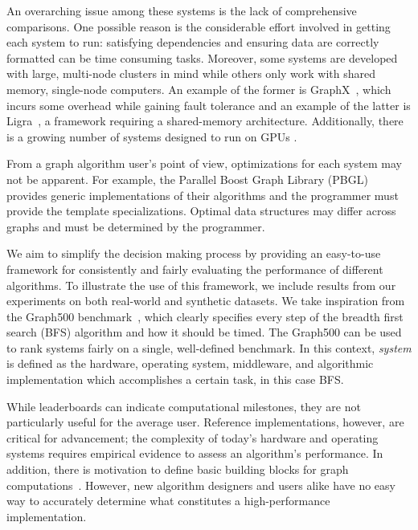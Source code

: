 \documentclass[conference]{IEEEtran}
\begin{document}
An overarching issue among these systems is the lack of comprehensive comparisons. One possible reason is the considerable effort involved in getting each system to run: satisfying dependencies and ensuring data are correctly formatted can be time consuming tasks. Moreover, some systems are developed with large, multi-node clusters in mind while others only work with shared memory, single-node computers. An example of the former is GraphX~\cite{Xin:2013:GraphX}, which incurs some overhead while gaining fault tolerance and an example of the latter is Ligra~\cite{Shun:2013:Ligra}, a framework requiring a shared-memory architecture. Additionally, there is a growing number of systems designed to run on GPUs \cite{Zhong:2014:Medusa}.

From a graph algorithm user's point of view, optimizations for each system may not be apparent. For example, the Parallel Boost Graph Library (PBGL)~\cite{Gregor:2005:PBGL} provides generic implementations of their algorithms and the programmer must provide the template specializations. Optimal data structures may differ across graphs and must be determined by the programmer.

We aim to simplify the decision making process by providing an easy-to-use framework for consistently and fairly evaluating the performance of different algorithms. To illustrate the use of this framework, we include results from our experiments on both real-world and synthetic datasets. We take inspiration from the Graph500 benchmark~\cite{Murphy:2010:Graph500}, which clearly specifies every step of the breadth first search (BFS) algorithm and how it should be timed. The Graph500 can be used to rank systems fairly on a single, well-defined benchmark. In this context, \emph{system} is defined as the hardware, operating system, middleware, and algorithmic implementation which accomplishes a certain task, in this case BFS.

While leaderboards can indicate computational milestones, they are not particularly useful for the average user. Reference implementations, however, are critical for advancement; the complexity of today's hardware and operating systems requires empirical evidence to assess an algorithm's performance. In addition, there is motivation to define basic building blocks for graph computations~\cite{GABB16, Buluc:CombBLAS:2011}. However, new algorithm designers and users alike have no easy way to accurately determine what constitutes a high-performance implementation.
\end{document}

